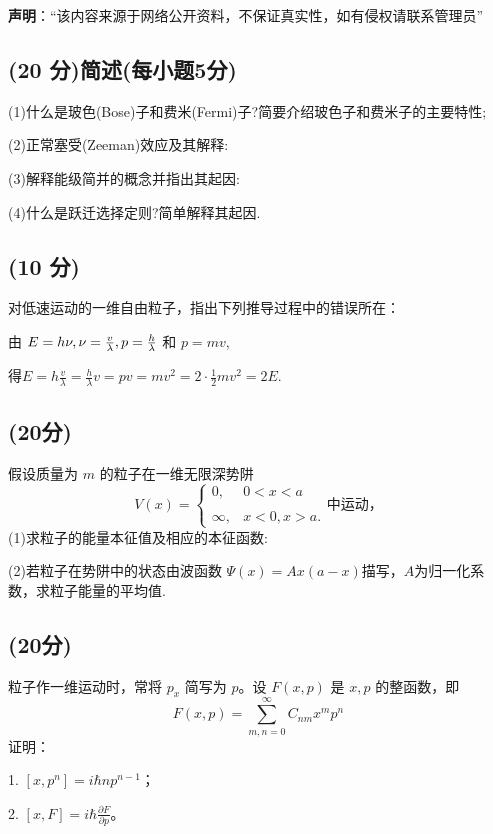 
\textbf{声明}：“该内容来源于网络公开资料，不保证真实性，如有侵权请联系管理员”

\subsection{(20 分)简述(每小题5分)}
(1)什么是玻色(Bose)子和费米(Fermi)子?简要介绍玻色子和费米子的主要特性;

(2)正常塞受(Zeeman)效应及其解释:

(3)解释能级简并的概念并指出其起因:

(4)什么是跃迁选择定则?简单解释其起因.
\subsection{(10 分)}
对低速运动的一维自由粒子，指出下列推导过程中的错误所在：

由 $E = h \nu, \\ \nu = \frac{v}{\lambda}, \\ p = \frac{h}{\lambda}$ 和 $ p = mv$,

得$E = h \frac{v}{\lambda} = \frac{h}{\lambda} v = p v = mv^2 = 2 \cdot \frac{1}{2} mv^2 = 2E$.
\subsection{(20分)}
假设质量为 $m$ 的粒子在一维无限深势阱
\[V(x) = \begin{cases}    0, & 0<x<a \\\\   \infty, & x<0,x> a.    \end{cases}\text{中运动，}~\]
(1)求粒子的能量本征值及相应的本征函数:

(2)若粒子在势阱中的状态由波函数 $\Psi(x)=Ax(a-x)$描写，$A$为归一化系数，求粒子能量的平均值.
\subsection{(20分)}
粒子作一维运动时，常将 $p_x$ 简写为 $p$。设 $F(x, p)$ 是 $x, p$ 的整函数，即 
$$F(x, p) = \sum_{m,n=0}^{\infty} C_{nm} x^m p^n~$$
证明：

1. $[x, p^n] = i \hbar n p^{n-1}$；

2. $[x, F] = i \hbar \frac{\partial F}{\partial p}$。